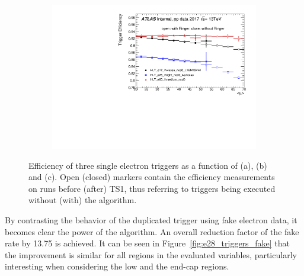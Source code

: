 \begin{figure}[h!tb]
\begin{center}
\begin{subfigure}[c]{.48\textwidth}
  \centering
  \includegraphics[width=\textwidth]{sections/operation/figures/efficiencies/eff_EGAM1_e17_e26_e60_2017_before_and_after_ts1_mu.pdf}
  \caption{}%
  \end{subfigure}
  \caption{Efficiency of three single electron triggers as a function of
  \et (a), \eta (b) and \avgmu (c). Open (closed) markers contain
  the efficiency measurements on runs before (after) TS1, thus referring to
  triggers being executed without (with) the \rnn{} algorithm.
  }%
  \label{fig:2017_ts1}
  \end{center}
\end{figure}


By contrasting the behavior of the duplicated trigger using fake electron data,
it becomes clear the power of the \rnn{} algorithm. An overall reduction factor of
the fake rate by 13.75 is achieved. It can be seen in
Figure~\ref{fig:e28_triggers_fake} that the improvement is similar for all
regions in the evaluated variables, particularly interesting when
considering the low \et{} and the end-cap regions.




